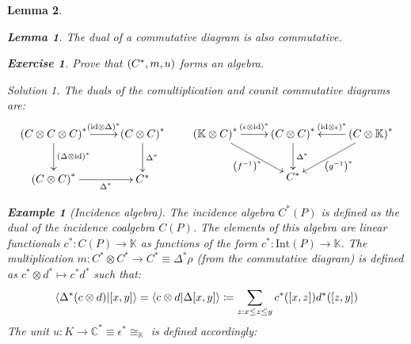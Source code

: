 \documentclass{article}
\newtheorem{Lemma}{Lemma}
\theoremstyle{definition}
\newtheorem*{Example*}{Example}
\newtheorem{Exercise}{Exercise}
\theoremstyle{remark}
\newtheorem*{Solution*}{Solution}
\theoremstyle{underline}
\theoremstyle{underline}
\newcommand{\id}{\mathrm{id}}
\begin{document}
\begin{Lemma}
 	\begin{Lemma}
 		The dual of a commutative diagram is also commutative.
 	\end{Lemma}
 	
 	\begin{Exercise}
 		Prove that $\pqty{C^*, m, u}$ forms an algebra.
 	\end{Exercise}
 	\begin{Solution*}
 		The duals of the comultiplication and counit commutative diagrams are:
 		\begin{equation*}
		\xymatrix{
			\pqty{C \otimes C \otimes C}^* \ar[r]^-{\pqty{\id \otimes \Delta}^*} \ar[d]^-{\pqty{\Delta \otimes \id}^*} & \pqty{C \otimes C}^*   \ar[d]^-{\Delta^*} \\
			\pqty{C \otimes C}^* \ar[r]_-{\Delta^*} & C^*
		} \;\;\;\;\;\;\;
		\xymatrix{
			\pqty{\mathbb K \otimes C}^* \ar[r]^-{\pqty{\epsilon \otimes \id}^*} \ar[rd]_-{\pqty{f^{-1}}^*} & \pqty{C \otimes C}^* \ar[d]^-{\Delta^*} & \pqty{C \otimes \mathbb K}^* \ar[l]_-{\pqty{\id \otimes \epsilon}^*} \ar[ld]^-{\pqty{g^{-1}}^*} \\
			& C^* &	
		}
		\end{equation*}
 	\end{Solution*}

 	\begin{Example*}[Incidence algebra]
 		The \emph{incidence algebra} $C^*(P)$ is defined as the dual of the incidence coalgebra $C(P)$. The elements of this algebra are linear functionals $c^*\colon C(P) \to \mathbb K$ as functions of the form $c^*\colon \mathrm{Int}(P) \to \mathbb K$. The multiplication $m\colon C^* \otimes C^* \to C^* \equiv \Delta^* \rho$ (from the commutative diagram) is defined as $c^* \otimes d^* \mapsto c^* d^*$ such that:
 		\begin{gather*}
 			\braket{\Delta^*\pqty{c \otimes d}}{[x,y]} = \braket{c \otimes d}{\Delta[x,y]} \coloneqq \sum_{z: x \leq z \leq y} c^*\pqty{[x,z]}d^*\pqty{[z,y]}
 		\end{gather*}
 		The unit $u\colon K \to \mathbb C^* \equiv \epsilon^* \cong_{\mathbb K}$ is defined accordingly:

 	\end{Example*}
	

\end{Lemma}
\end{document}
